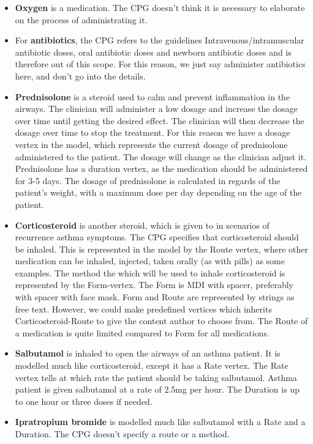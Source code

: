 \begin{itemize}
	\item \textbf{Oxygen} is a medication. The CPG doesn't think it is necessary to elaborate on the process of administrating it.
	
	\item For \textbf{antibiotics}, the CPG refers to the guidelines Intravenous/intramuscular antibiotic doses, oral antibiotic doses and newborn antibiotic doses \parencite{RepublicofKeny2016} and is therefore out of this scope. For this reason, we just say administer antibiotics here, and don't go into the details.
	
	\item \textbf{Prednisolone} is a steroid used to calm and prevent inflammation in the airways. The clinician will administer a low dosage and increase the dosage over time until getting the desired effect. The clinician will then decrease the dosage over time to stop the treatment. For this reason we have a dosage vertex in the model, which represents the current dosage of prednisolone administered to the patient. The dosage will change as the clinician adjust it. Prednisolone has a duration vertex, as the medication should be administered for 3-5 days. The dosage of prednisolone is calculated in regards of the patient's weight, with a maximum dose per day depending on the age of the patient.
	
	\item \textbf{Corticosteroid} is another steroid, which is given to in scenarios of recurrence asthma symptoms. The CPG specifies that corticosteroid should be inhaled. This is represented in the model by the Route vertex, where other medication can be inhaled, injected, taken orally (as with pills) as some examples. The method the which will be used to inhale corticosteroid is represented by the Form-vertex. The Form is MDI with spacer, preferably with spacer with face mask. Form and Route are represented by strings as free text. However, we could make predefined vertices which inherits Corticosteroid-Route to give the content author to choose from. The Route of a medication is quite limited compared to Form for all medications.
	
	\item \textbf{Salbutamol} is inhaled to open the airways of an asthma patient. It is modelled much like corticosteroid, except it has a Rate vertex. The Rate vertex tells at which rate the patient should be taking salbutamol. Asthma patient is given salbutamol at a rate of 2.5mg per hour. The Duration is up to one hour or three doses if needed.
	
	\item \textbf{Ipratropium bromide} is modelled much like salbutamol with a Rate and a Duration. The CPG doesn't specify a route or a method.
\end{itemize}

